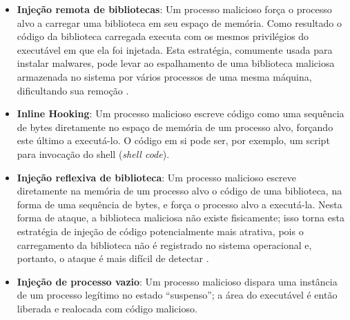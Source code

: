 \documentclass[conference]{IEEEtran}
\newcommand{\marcos}[1]{{\color{blue}{MARCOS: #1}}}
\begin{document}
\begin{itemize}
 \item \textbf{Injeção remota de bibliotecas}: Um processo malicioso força o processo alvo a carregar uma biblioteca em seu espaço de memória. 
	Como resultado 
	o código da biblioteca carregada executa com os mesmos privilégios do executável em que ela foi injetada. 
	Esta estratégia, comumente usada para instalar malwares, pode levar ao espalhamento de uma biblioteca maliciosa armazenada no sistema por vários processos de uma mesma máquina, dificultando sua remoção \cite{Miller2004}.
 
\item \textbf{Inline Hooking}: Um processo malicioso escreve código como uma sequência de bytes diretamente no espaço de memória de um processo alvo, forçando este último a executá-lo. 
	O código em si pode ser, por exemplo, um script para invocação do shell (\textit{shell code}).
	
 \item \textbf{Injeção reflexiva de biblioteca}: Um processo malicioso escreve diretamente na memória de um processo alvo o código de uma biblioteca, na forma de uma sequência de bytes, e força o processo alvo a executá-la. 
	Nesta forma de ataque, a biblioteca maliciosa não existe fisicamente; isso torna esta estratégia de injeção de código potencialmente mais atrativa, pois o carregamento da biblioteca não é registrado no sistema operacional e, portanto, o ataque é mais difícil de detectar \cite{Fewer2008}.
	
	
 \item \textbf{Injeção de processo vazio}: Um processo malicioso dispara uma instância de um processo legítimo no estado ``suspenso''; a área do executável é então liberada e realocada com código malicioso.
\end{itemize}
\end{document}
